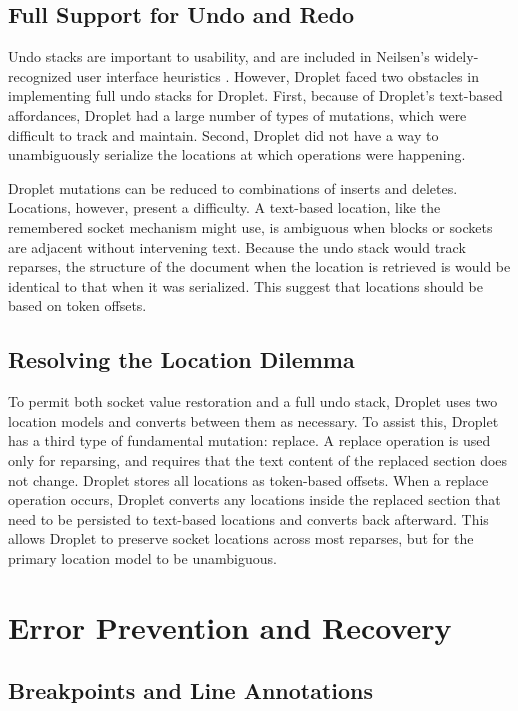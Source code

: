 \documentclass[conference]{IEEEtran}
\begin{document}
\subsection{Full Support for Undo and Redo}
Undo stacks are important to usability, and are included in Neilsen's widely-recognized user interface heuristics \cite{Neilsen}. However, Droplet faced two obstacles in implementing full undo stacks for Droplet. First, because of Droplet's text-based affordances, Droplet had a large number of types of mutations, which were difficult to track and maintain. Second, Droplet did not have a way to unambiguously serialize the locations at which operations were happening.

Droplet mutations can be reduced to combinations of inserts and deletes. Locations, however, present a difficulty. A text-based location, like the remembered socket mechanism might use, is ambiguous when blocks or sockets are adjacent without intervening text. Because the undo stack would track reparses, the structure of the document when the location is retrieved is would be identical to that when it was serialized. This suggest that locations should be based on token offsets.

\subsection{Resolving the Location Dilemma}
To permit both socket value restoration and a full undo stack, Droplet uses two location models and converts between them as necessary. To assist this, Droplet has a third type of fundamental mutation: replace. A replace operation is used only for reparsing, and requires that the text content of the replaced section does not change. Droplet stores all locations as token-based offsets. When a replace operation occurs, Droplet converts any locations inside the replaced section that need to be persisted to text-based locations and converts back afterward. This allows Droplet to preserve socket locations across most reparses, but for the primary location model to be unambiguous.

\section{Error Prevention and Recovery}

\subsection{Breakpoints and Line Annotations}
\end{document}
